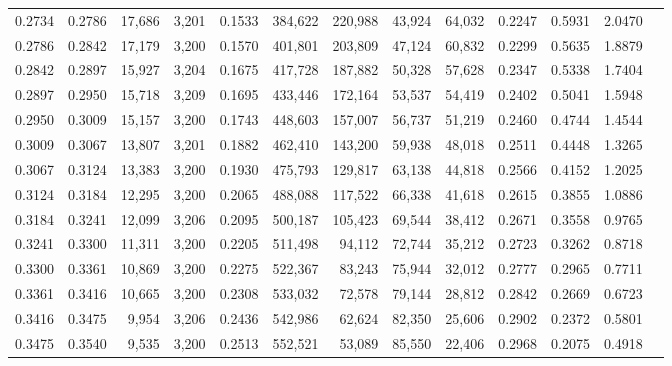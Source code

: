 \begin{tabular}{rrrrrrrrrrrrr}
0.2734 & 0.2786 & 17,686 & 3,201 &                                     0.1533 & 384,622 & 220,988 &  43,924 &  64,032 & 0.2247 & 0.5931 & 2.0470 \\
0.2786 & 0.2842 & 17,179 & 3,200 &                                     0.1570 & 401,801 & 203,809 &  47,124 &  60,832 & 0.2299 & 0.5635 & 1.8879 \\
0.2842 & 0.2897 & 15,927 & 3,204 &                                     0.1675 & 417,728 & 187,882 &  50,328 &  57,628 & 0.2347 & 0.5338 & 1.7404 \\
0.2897 & 0.2950 & 15,718 & 3,209 &                                     0.1695 & 433,446 & 172,164 &  53,537 &  54,419 & 0.2402 & 0.5041 & 1.5948 \\
0.2950 & 0.3009 & 15,157 & 3,200 &                                     0.1743 & 448,603 & 157,007 &  56,737 &  51,219 & 0.2460 & 0.4744 & 1.4544 \\
0.3009 & 0.3067 & 13,807 & 3,201 &                                     0.1882 & 462,410 & 143,200 &  59,938 &  48,018 & 0.2511 & 0.4448 & 1.3265 \\
0.3067 & 0.3124 & 13,383 & 3,200 &                                     0.1930 & 475,793 & 129,817 &  63,138 &  44,818 & 0.2566 & 0.4152 & 1.2025 \\
0.3124 & 0.3184 & 12,295 & 3,200 &                                     0.2065 & 488,088 & 117,522 &  66,338 &  41,618 & 0.2615 & 0.3855 & 1.0886 \\
0.3184 & 0.3241 & 12,099 & 3,206 &                                     0.2095 & 500,187 & 105,423 &  69,544 &  38,412 & 0.2671 & 0.3558 & 0.9765 \\
0.3241 & 0.3300 & 11,311 & 3,200 &                                     0.2205 & 511,498 &  94,112 &  72,744 &  35,212 & 0.2723 & 0.3262 & 0.8718 \\
0.3300 & 0.3361 & 10,869 & 3,200 &                                     0.2275 & 522,367 &  83,243 &  75,944 &  32,012 & 0.2777 & 0.2965 & 0.7711 \\
0.3361 & 0.3416 & 10,665 & 3,200 &                                     0.2308 & 533,032 &  72,578 &  79,144 &  28,812 & 0.2842 & 0.2669 & 0.6723 \\
0.3416 & 0.3475 &  9,954 & 3,206 &                                     0.2436 & 542,986 &  62,624 &  82,350 &  25,606 & 0.2902 & 0.2372 & 0.5801 \\
0.3475 & 0.3540 &  9,535 & 3,200 &                                     0.2513 & 552,521 &  53,089 &  85,550 &  22,406 & 0.2968 & 0.2075 & 0.4918 \\

\end{tabular}
